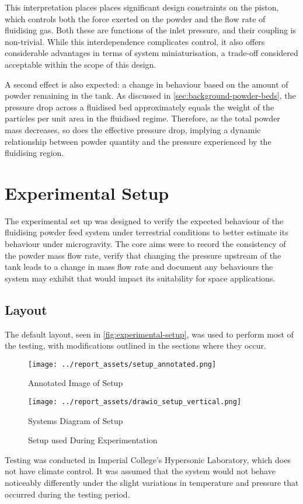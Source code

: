 This interpretation places places significant design constraints on the piston, which controls both the force exerted on the powder and the flow rate of fluidising gas. Both these are functions of the inlet pressure, and their coupling is non-trivial. While this interdependence complicates control, it also offers considerable advantages in terms of system miniaturisation, a trade-off considered acceptable within the scope of this design.

A second effect is also expected: a change in behaviour based on the amount of powder remaining in the tank. As discussed in \autoref{sec:background-powder-beds}, the pressure drop across a fluidised bed approximately equals the weight of the particles per unit area in the fluidised regime. Therefore, as the total powder mass decreases, so does the effective pressure drop, implying a dynamic relationship between powder quantity and the pressure experienced by the fluidising region.

\section{Experimental Setup}
The experimental set up was designed to verify the expected behaviour of the fluidising powder feed system under terrestrial conditions to better estimate its behaviour under microgravity. The core aims were to record the consistency of the powder mass flow rate, verify that changing the pressure upstream of the tank leads to a change in mass flow rate and document any behaviours the system may exhibit that would impact its suitability for space applications.

\subsection{Layout}
The default layout, seen in \autoref{fig:experimental-setup}, was used to perform most of the testing, with modifications outlined in the sections where they occur. 
\begin{figure}[htbp]
    \centering

    \begin{minipage}{0.6\textwidth}
        \centering
        \texttt{[image: ../report\_assets/setup\_annotated.png]}
        \caption*{Annotated Image of Setup}
    \end{minipage}
    \hfill
    \begin{minipage}{0.3\textwidth}
        \centering
        \texttt{[image: ../report\_assets/drawio\_setup\_vertical.png]}
        \caption*{Systems Diagram of Setup}
    \end{minipage}
    \caption{Setup used During Experimentation}\label{fig:experimental-setup}
\end{figure}
Testing was conducted in Imperial College's Hypersonic Laboratory, which does not have climate control. It was assumed that the system would not behave noticeably differently under the slight variations in temperature and pressure that occurred during the testing period.

